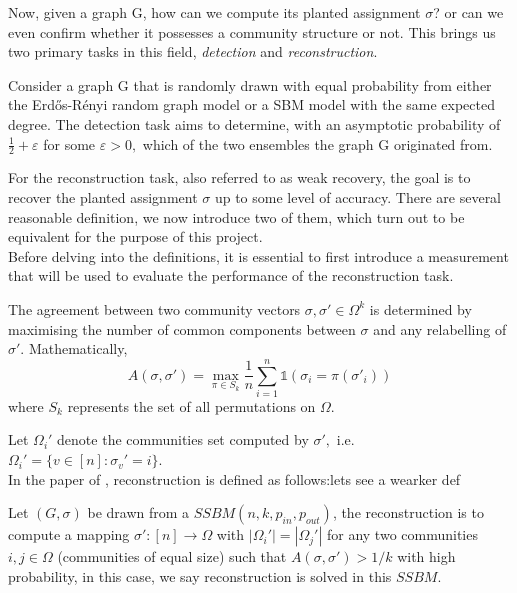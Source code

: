 Now, given a graph G, how can we compute its planted assignment $\sigma$? or  can we even confirm whether it possesses a community structure or not. This brings us two primary tasks in this field, \textit{detection} and \textit{reconstruction}.
\begin{definition}[Detection]
    Consider a graph G that is randomly drawn with equal probability from either the Erd\H{o}s-R\'{e}nyi random graph model or a SBM model with the same expected degree. The detection task aims to determine, with an asymptotic probability of $\frac{1}{2}+\varepsilon$ for some $\varepsilon > 0,$ which of the two ensembles the graph G originated from.
\end{definition}
For the reconstruction task, also referred to as weak recovery, the goal is to recover the planted assignment $\sigma$ up to some level of accuracy. There are several reasonable definition, we now introduce two of them, which turn out to be equivalent for the purpose of this project.\\
Before delving into the definitions, it is essential to first introduce a measurement that will be used to evaluate the performance of the reconstruction task.
\begin{definition}[Agreement]
The agreement between two community vectors $\sigma, \sigma'\in\Omega^k$ is determined by maximising the number of common components between $\sigma$ and any relabelling of $\sigma'.$ Mathematically, \begin{equation}
    A(\sigma, \sigma')=\max_{\pi \in S_k} \frac{1}{n} \sum_{i=1}^{n} \mathbb{1}(\sigma_i = \pi(\sigma'_i))
\end{equation}
where $S_k$ represents the set of all permutations on $\Omega$.
\end{definition}
Let $\Omega_i'$ denote the communities set computed by $\sigma',$ i.e. $\Omega_i'=\{v\in[n]: \sigma_v'=i\}.$\\
In the paper of \cite{TheSurvey} \cite{firstpaper}, reconstruction is defined as follows:\textcolor{Mahogany}{lets see a wearker def}
\begin{definition}[Reconstruction]\label{def: recover_1}
Let $(G, \sigma)$ be drawn from a $SSBM(n, k, p_{in}, p_{out})$, the reconstruction is to compute a mapping $\sigma': [n]\rightarrow \Omega$ with $|\Omega_i'|=|\Omega_j'|$ for any two communities $i, j\in\Omega$ (communities of equal size) such that $A(\sigma, \sigma')> 1/k$ \textcolor{Mahogany}{with high probability,} in this case, we say reconstruction is solved in this $SSBM$.
\end{definition}
